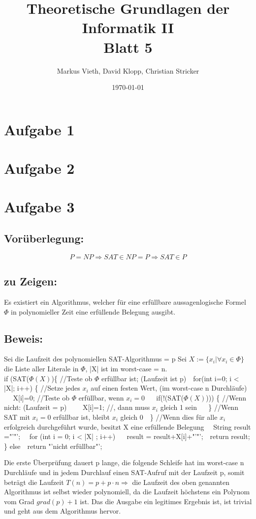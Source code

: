\documentclass[a4paper,11pt,twoside]{article}
\title{Theoretische Grundlagen der Informatik II\\ Blatt 5}
\author{Markus Vieth, David Klopp, Christian Stricker}
\date{\today}
\begin{document}
\maketitle
\cleardoublepage
\pagestyle{myheadings}

\section*{Aufgabe 1}


\section*{Aufgabe 2}



\section*{Aufgabe 3}
\subsection*{Vorüberlegung:}
\[P=NP \Rightarrow SAT\in NP=P\Rightarrow SAT\in P\]
\subsection*{zu Zeigen:}
Es existiert ein Algorithmus, welcher für eine erfüllbare aussagenlogische Formel $\Phi$ in polynomieller Zeit eine erfüllende Belegung ausgibt.\\
\subsection*{Beweis:}
Sei die Laufzeit des polynomiellen SAT-Algorithmus = p
Sei $X:=\{x_i| \forall x_i \in \Phi\}$ die Liste aller Literale in $\Phi$, |X| ist im worst-case = n.\\
if (SAT($\Phi(X)$)\{  //Teste ob $\Phi$ erfüllbar ist; (Laufzeit ist p) 
$~~~$for(int i=0; i < |X|; i++) \{  //Setze jedes $x_i$ auf einen festen Wert, (im worst-case n Durchläufe)
$~~~$$~~~$X[i]=0;  //Teste ob $\Phi$ erfüllbar, wenn $x_i=0$
$~~~$$~~~$if(!(SAT($\Phi(X)$))) \{ //Wenn nicht: (Laufzeit = p)
$~~~$$~~~$$~~~$X[i]=1; 	//, dann muss $x_i$ gleich 1 sein
$~~~$$~~~$\} //Wenn SAT mit $x_i=0$ erfüllbar ist, bleibt $x_i$ gleich 0 
$~~~$\} //Wenn dies für alle $x_i$ erfolgreich durchgeführt wurde, besitzt X eine erfüllende Belegung
$~~~$ String result ="'"';
$~~~$ for (int i = 0; i < |X| ; i++)
$~~~$$~~~$result = result+X[i]+"'"';
$~~~$return result;
\}
else
$~~~$return "'nicht erfüllbar"';

Die erste Überprüfung dauert p lange, die folgende Schleife hat im worst-case n Durchläufe und in jedem Durchlauf einen SAT-Aufruf mit der Laufzeit p, somit beträgt die Laufzeit $T(n)=p+p\cdot n \Rightarrow$ die Laufzeit des oben genannten Algorithmus ist selbst wieder polynomiell, da die Laufzeit höchstens ein Polynom vom Grad $grad(p)+1$ ist. Das die Ausgabe ein legitimes Ergebnis ist, ist trivial und geht aus dem Algorithmus hervor.
\end{document}
